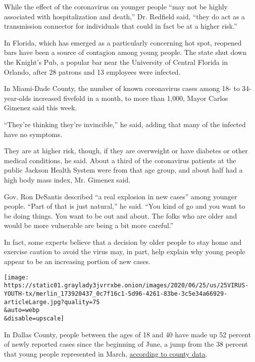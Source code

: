 While the effect of the coronavirus on younger people ``may not be
highly associated with hospitalization and death,'' Dr. Redfield said,
``they do act as a transmission connector for individuals that could in
fact be at a higher risk.''

In Florida, which has emerged as a particularly concerning hot spot,
reopened bars have been a source of contagion among young people. The
state shut down the Knight's Pub, a popular bar near the University of
Central Florida in Orlando, after 28 patrons and 13 employees were
infected.

In Miami-Dade County, the number of known coronavirus cases among 18- to
34-year-olds increased fivefold in a month, to more than 1,000, Mayor
Carlos Gimenez said this week.

``They're thinking they're invincible,'' he said, adding that many of
the infected have no symptoms.

They are at higher risk, though, if they are overweight or have diabetes
or other medical conditions, he said. About a third of the coronavirus
patients at the public Jackson Health System were from that age group,
and about half had a high body mass index, Mr. Gimenez said.

Gov. Ron DeSantis described ``a real explosion in new cases'' among
younger people. ``Part of that is just natural,'' he said. ``You kind of
go and you want to be doing things. You want to be out and about. The
folks who are older and would be more vulnerable are being a bit more
careful.''

In fact, some experts believe that a decision by older people to stay
home and exercise caution to avoid the virus may, in part, help explain
why young people appear to be an increasing portion of new cases.

\texttt{[image: https://static01.graylady3jvrrxbe.onion/images/2020/06/25/us/25VIRUS-YOUTH-tx/merlin\_173920437\_0c7f16c1-5d96-4261-83be-3c5e34a66929-articleLarge.jpg?quality=75\\\&auto=webp\\\&disable=upscale]}

In Dallas County, people between the ages of 18 and 40 have made up 52
percent of newly reported cases since the beginning of June, a jump from
the 38 percent that young people represented in March,
\href{https://www.dallascounty.org/Assets/uploads/docs/hhs/2019-nCoV/COVID-19\%20DCHHS\%20Summary_062320.pdf}{according
to county data}.

\href{https://www.nytimes3xbfgragh.onion/news-event/coronavirus?action=click\&pgtype=Article\&state=default\&region=MAIN_CONTENT_3\&context=storylines_faq}{}

